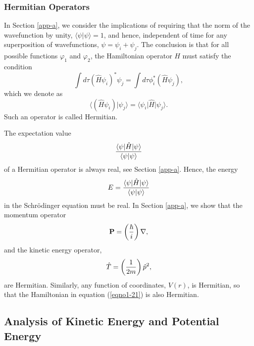\subsubsection{Hermitian Operators}

In Section \ref{app-a}, we consider the implications of requiring that
the norm of the wavefunction by unity, $\langle \psi | \psi \rangle =
1$, and hence, independent of time for any superposition of
wavefunctions, $\psi = \psi_i + \psi_j$. The conclusion is that for
all possible functions $\varphi_1$ and $\varphi_2$, the Hamiltonian
operator $H$ must satisfy the condition
\begin{equation}
\int d \tau \left( {\hat H} \psi_i \right) ^* \psi_j = \int d \tau 
\phi_i ^* \left( {\hat H} \psi_j \right),
\end{equation}
which we denote as
\begin{equation}
\langle \left( {\hat H} \psi_i \right) \vert \psi_j \rangle = \langle \psi_i \vert {\hat H} 
\vert \psi_j \rangle .
\end{equation}
Such an operator is called Hermitian.

The expectation value
\begin{equation}
{\langle \psi | {\hat H} | \psi \rangle \over \langle \psi | \psi \rangle}
\end{equation}
of a Hermitian operator is always real, see Section
\ref{app-a}. Hence, the energy
\begin{equation}
E = {\langle \psi | {\hat H} | \psi \rangle \over \langle \psi | \psi \rangle}
\end{equation}
in the Schr\"odinger equation must be real.
In Section \ref{app-a}, we show that the momentum operator
\begin{equation}
{\bf P} = \left( {\hbar \over i} \right) \nabla ,
\end{equation}
and the kinetic energy operator,
\begin{equation}
{\hat T} = \left( {1 \over 2m} \right) {\hat p}^2 ,
\end{equation}
are Hermitian.  Similarly, any function of coordinates, $V(r)$, is
Hermitian, so that the Hamiltonian in equation (\ref{eqno1-21}) is
also Hermitian.

\subsection{Analysis of Kinetic Energy and Potential Energy}

